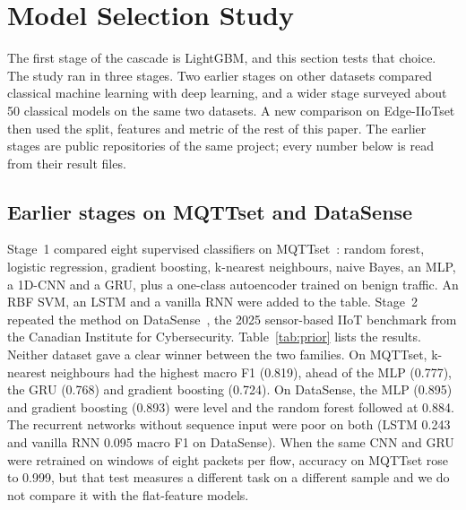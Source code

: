 \section{Model Selection Study}
\label{sec:models}
The first stage of the cascade is LightGBM, and this section tests that choice. The study ran in three stages. Two earlier stages on other datasets compared classical machine learning with deep learning, and a wider stage surveyed about 50 classical models on the same two datasets. A new comparison on Edge-IIoTset then used the split, features and metric of the rest of this paper. The earlier stages are public repositories of the same project; every number below is read from their result files.

\subsection{Earlier stages on MQTTset and DataSense}
Stage~1 compared eight supervised classifiers on MQTTset~\cite{vaccari2020}: random forest, logistic regression, gradient boosting, k-nearest neighbours, naive Bayes, an MLP, a 1D-CNN and a GRU, plus a one-class autoencoder trained on benign traffic. An RBF SVM, an LSTM and a vanilla RNN were added to the table. Stage~2 repeated the method on DataSense~\cite{firouzi2025}, the 2025 sensor-based IIoT benchmark from the Canadian Institute for Cybersecurity. Table~\ref{tab:prior} lists the results. Neither dataset gave a clear winner between the two families. On MQTTset, k-nearest neighbours had the highest macro F1 (0.819), ahead of the MLP (0.777), the GRU (0.768) and gradient boosting (0.724). On DataSense, the MLP (0.895) and gradient boosting (0.893) were level and the random forest followed at 0.884. The recurrent networks without sequence input were poor on both (LSTM 0.243 and vanilla RNN 0.095 macro F1 on DataSense). When the same CNN and GRU were retrained on windows of eight packets per flow, accuracy on MQTTset rose to 0.999, but that test measures a different task on a different sample and we do not compare it with the flat-feature models.

\begin{table}[t]
\centering
\caption{Earlier stages: classical and neural classifiers on MQTTset and DataSense, ordered by macro F1 within each dataset. MQTTset: 231,646 training and 99,290 test rows, 33 features. DataSense: 31,538 training and 13,517 test rows, 109 features. $^\dagger$ trained on a 40,000-row subsample because the full fit did not finish.}
\label{tab:prior}
\small

\end{table}

